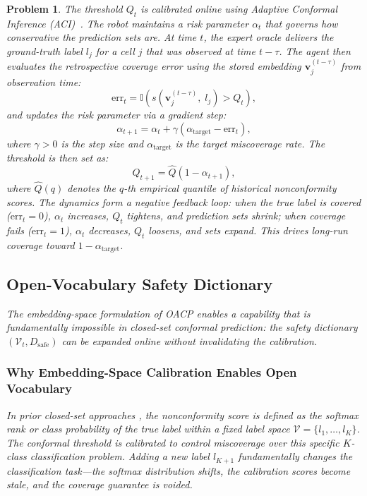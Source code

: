 \documentclass[letterpaper, 10 pt, conference]{ieeeconf}  %
\newtheorem{myprob}{\bf Problem}
\begin{document}
\begin{myprob}
The threshold $Q_t$ is calibrated online using Adaptive Conformal Inference (ACI)~\cite{gibbs2021adaptive}. The robot maintains a risk parameter $\alpha_t$ that governs how conservative the prediction sets are. At time $t$, the expert oracle delivers the ground-truth label $l_j$ for a cell $j$ that was observed at time $t - \tau$. The agent then evaluates the retrospective coverage error using the stored embedding $\mathbf{v}_j^{(t-\tau)}$ from observation time:
\begin{equation}
    \text{err}_t = \mathbb{I}\!\left( s\!\left(\mathbf{v}_j^{(t-\tau)},\; l_j\right) > Q_t \right),
\end{equation}
and updates the risk parameter via a gradient step:
\begin{equation}
    \alpha_{t+1} = \alpha_t + \gamma \left( \alpha_{\text{target}} - \text{err}_t \right),
    \label{eq:aci_update}
\end{equation}
where $\gamma > 0$ is the step size and $\alpha_{\text{target}}$ is the target miscoverage rate. The threshold is then set as:
\begin{equation}
    Q_{t+1} = \hat{Q}\!\left(1 - \alpha_{t+1}\right),
    \label{eq:tau_update}
\end{equation}
where $\hat{Q}(q)$ denotes the $q$-th empirical quantile of historical nonconformity scores. The dynamics form a negative feedback loop: when the true label is covered ($\text{err}_t = 0$), $\alpha_t$ increases, $Q_t$ tightens, and prediction sets shrink; when coverage fails ($\text{err}_t = 1$), $\alpha_t$ decreases, $Q_t$ loosens, and sets expand. This drives long-run coverage toward $1 - \alpha_{\text{target}}$.

\subsection{Open-Vocabulary Safety Dictionary}
\label{subsec:open_vocab}

The embedding-space formulation of OACP enables a capability that is fundamentally impossible in closed-set conformal prediction: the safety dictionary $(\mathcal{V}_t, D_{\text{safe}})$ can be expanded online without invalidating the calibration.

\subsubsection{Why Embedding-Space Calibration Enables Open Vocabulary}

In prior closed-set approaches \cite{sundarsingh2026safeplanningunknownenvironments}, the nonconformity score is defined as the softmax rank or class probability of the true label within a fixed label space $\mathcal{V} = \{l_1, \dots, l_K\}$. The conformal threshold is calibrated to control miscoverage over this specific $K$-class classification problem. Adding a new label $l_{K+1}$ fundamentally changes the classification task---the softmax distribution shifts, the calibration scores become stale, and the coverage guarantee is voided.


\end{myprob}
\end{document}
